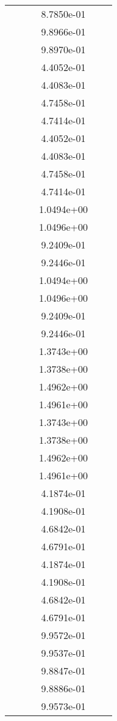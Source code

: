 \begin{xltabular}{\textwidth}{r|rS[table-format=1.3e+2]S[table-format=1.4e+2]S[table-format=1.4e+2]S[table-format=-1.5]}
&  &  & 8.7850e-01 & & \\
&  &  & 9.8966e-01 & & \\
&  &  & 9.8970e-01 & & \\
&  &  & 4.4052e-01 & & \\
&  &  & 4.4083e-01 & & \\
&  &  & 4.7458e-01 & & \\
&  &  & 4.7414e-01 & & \\
&  &  & 4.4052e-01 & & \\
&  &  & 4.4083e-01 & & \\
&  &  & 4.7458e-01 & & \\
&  &  & 4.7414e-01 & & \\
&  &  & 1.0494e+00 & & \\
&  &  & 1.0496e+00 & & \\
&  &  & 9.2409e-01 & & \\
&  &  & 9.2446e-01 & & \\
&  &  & 1.0494e+00 & & \\
&  &  & 1.0496e+00 & & \\
&  &  & 9.2409e-01 & & \\
&  &  & 9.2446e-01 & & \\
&  &  & 1.3743e+00 & & \\
&  &  & 1.3738e+00 & & \\
&  &  & 1.4962e+00 & & \\
&  &  & 1.4961e+00 & & \\
&  &  & 1.3743e+00 & & \\
&  &  & 1.3738e+00 & & \\
&  &  & 1.4962e+00 & & \\
&  &  & 1.4961e+00 & & \\
&  &  & 4.1874e-01 & & \\
&  &  & 4.1908e-01 & & \\
&  &  & 4.6842e-01 & & \\
&  &  & 4.6791e-01 & & \\
&  &  & 4.1874e-01 & & \\
&  &  & 4.1908e-01 & & \\
&  &  & 4.6842e-01 & & \\
&  &  & 4.6791e-01 & & \\
&  &  & 9.9572e-01 & & \\
&  &  & 9.9537e-01 & & \\
&  &  & 9.8847e-01 & & \\
&  &  & 9.8886e-01 & & \\
&  &  & 9.9573e-01 & & \\

\end{xltabular}
